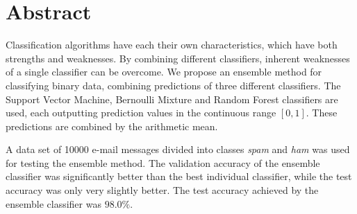 \section*{Abstract}

Classification algorithms have each their own characteristics, which
have both strengths and weaknesses. By combining different classifiers,
inherent weaknesses of a single classifier can be overcome. We propose
an ensemble method for classifying binary data, combining predictions of
three different classifiers. The Support Vector Machine, Bernoulli
Mixture and Random Forest classifiers are used, each outputting
prediction values in the continuous range $[0,1]$. These predictions are
combined by the arithmetic mean.

A data set of 10000 e-mail messages divided into classes \emph{spam} and
\emph{ham} was used for testing the ensemble method. The validation
accuracy of the ensemble classifier was significantly better than the
best individual classifier, while the test accuracy was only very
slightly better. The test accuracy achieved by the ensemble classifier
was $98.0 \%$.
